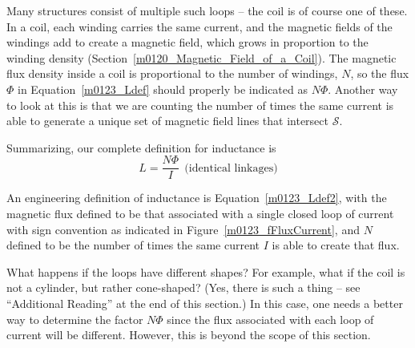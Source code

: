 Many structures consist of multiple such loops -- the coil 
is of course one of these.
In a coil, each winding carries the same current, and the magnetic fields of the windings add to create a magnetic field, which grows in proportion to the winding density (Section~\ref{m0120_Magnetic_Field_of_a_Coil}).
The magnetic flux density inside a coil is proportional to the number of windings, $N$, so 
the flux $\Phi$ in Equation~\ref{m0123_Ldef} should properly be indicated as $N\Phi$.
Another way to look at this is that we are counting the number of times the same current is able to generate a unique set of magnetic field lines that intersect ${\mathcal S}$.

Summarizing, our complete definition for inductance is
%
\begin{equation}
\boxed{
L = \frac{N\Phi}{I}~~\mbox{(identical linkages)}
}
\label{m0123_Ldef2}
\end{equation} 
%
\begin{mdframed}[backgroundcolor=yellow!20,nobreak=true] 
An engineering definition of inductance 
is Equation~\ref{m0123_Ldef2}, with the magnetic flux defined to be that associated with a single closed loop of current with sign convention as indicated in Figure~\ref{m0123_fFluxCurrent}, and $N$ defined to be the number of times the same current $I$ is able to create that flux.
\end{mdframed}
%
What happens if the loops have different shapes?  For example, what if the coil is not a cylinder, but rather cone-shaped? (Yes, there is such a thing -- see ``Additional Reading'' at the end of this section.)  In this case, one needs a better way to determine the factor $N\Phi$ since the flux associated with each loop of current will be different.  
However, this is beyond the scope of this section.  

